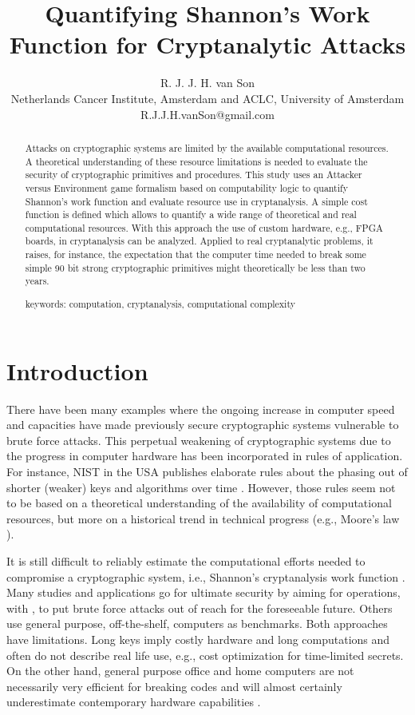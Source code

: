 \documentclass{article}
\title{Quantifying Shannon's Work Function for Cryptanalytic Attacks}
\author{R. J. J. H. van Son\\
Netherlands Cancer Institute, Amsterdam and ACLC, University of Amsterdam\\
R.J.J.H.vanSon@gmail.com}
\begin{document}
\maketitle
\newpage

\begin{abstract}
\noindent
Attacks on cryptographic systems are limited by the available computational resources.
A  theoretical understanding of these resource limitations 
is needed to evaluate the security of cryptographic primitives and procedures. 
This study uses an Attacker versus Environment game formalism based on 
computability logic to quantify Shannon's work function and evaluate resource use in cryptanalysis. 
A simple cost function is defined which allows to quantify a wide range
of theoretical and real computational resources. With this approach the use of 
custom hardware, e.g., FPGA boards, in cryptanalysis can be analyzed. 
Applied to real cryptanalytic problems, it raises, for instance, the expectation
that the computer time needed to break some simple 90 bit strong cryptographic 
primitives might theoretically be less than two years.

\noindent
keywords: computation, cryptanalysis, computational complexity
\end{abstract}

\newpage
\section{Introduction}

There have been many examples where the ongoing increase in computer speed and 
capacities have made previously secure cryptographic systems vulnerable to brute 
force attacks. This perpetual weakening of cryptographic systems due to the 
progress in computer hardware has been incorporated in rules of application. 
For instance, NIST in the USA publishes elaborate rules about the phasing out 
of shorter (weaker) keys and algorithms over time \cite{Polketal2006,BarkerNIST2004}. 
However, those rules seem not to be based on a theoretical
understanding of the availability of computational resources, but more on a 
historical trend in technical progress (e.g., Moore's law \cite{tuomi2002lives}).

It is still difficult to reliably estimate the computational efforts needed to compromise a 
cryptographic system, i.e., Shannon's cryptanalysis work function
\cite{Shannon1949}. 
Many studies and applications go for ultimate security by aiming for  operations, with 
, to put brute force attacks out of reach for the foreseeable future. Others use 
general purpose, off-the-shelf, computers as benchmarks. Both approaches 
have limitations. Long keys imply costly hardware and long computations and often do not describe
real life use, e.g., cost optimization for time-limited secrets. On the other hand, general 
purpose office and home computers are not necessarily 
very efficient for breaking codes and will almost certainly underestimate contemporary 
hardware capabilities \cite{Son0911-5262}.
\end{document}
